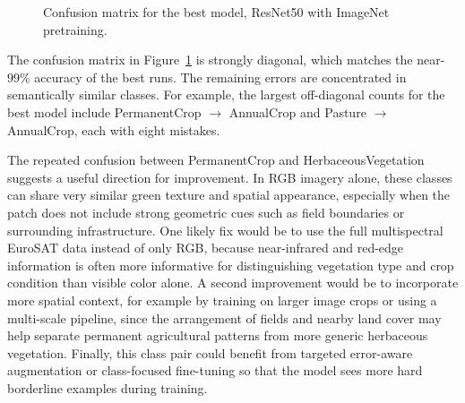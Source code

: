 \documentclass[11pt]{report}
\begin{document}
\begin{figure}[p]
    \centering
    \caption{Confusion matrix for the best model, ResNet50 with ImageNet pretraining.}
    \label{fig:confusion}
\end{figure}

The confusion matrix in Figure~\ref{fig:confusion} is strongly diagonal, which matches the near-\(99\%\) accuracy of the best runs. The remaining errors are concentrated in semantically similar classes. For example, the largest off-diagonal counts for the best model include PermanentCrop \(\rightarrow\) AnnualCrop and Pasture \(\rightarrow\) AnnualCrop, each with eight mistakes.

The repeated confusion between PermanentCrop and HerbaceousVegetation suggests a useful direction for improvement. In RGB imagery alone, these classes can share very similar green texture and spatial appearance, especially when the patch does not include strong geometric cues such as field boundaries or surrounding infrastructure. One likely fix would be to use the full multispectral EuroSAT data instead of only RGB, because near-infrared and red-edge information is often more informative for distinguishing vegetation type and crop condition than visible color alone. A second improvement would be to incorporate more spatial context, for example by training on larger image crops or using a multi-scale pipeline, since the arrangement of fields and nearby land cover may help separate permanent agricultural patterns from more generic herbaceous vegetation. Finally, this class pair could benefit from targeted error-aware augmentation or class-focused fine-tuning so that the model sees more hard borderline examples during training.
\end{document}
